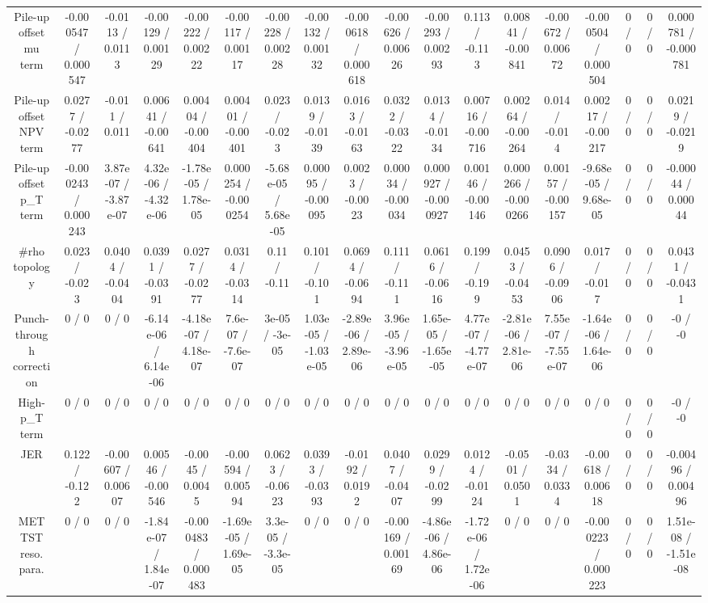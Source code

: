 \documentclass[10pt]{article}
\begin{document}
\begin{table}[htbp]
\begin{center}
\begin{tabular}{|c|c|c|c|c|c|c|c|c|c|c|c|c|c|c|c|c|c|}
  Pile-up offset mu term & -0.000547 / 0.000547 & -0.0113 / 0.0113 & -0.00129 / 0.00129 & -0.00222 / 0.00222 & -0.00117 / 0.00117 & -0.00228 / 0.00228 & -0.00132 / 0.00132 & -0.000618 / 0.000618 & -0.00626 / 0.00626 & -0.00293 / 0.00293 & 0.113 / -0.113 & 0.00841 / -0.00841 & -0.00672 / 0.00672 & -0.000504 / 0.000504 & 0 / 0 & 0 / 0 & 0.000781 / -0.000781 \\ 
  Pile-up offset NPV term & 0.0277 / -0.0277 & -0.011 / 0.011 & 0.00641 / -0.00641 & 0.00404 / -0.00404 & 0.00401 / -0.00401 & 0.023 / -0.023 & 0.0139 / -0.0139 & 0.0163 / -0.0163 & 0.0322 / -0.0322 & 0.0134 / -0.0134 & 0.00716 / -0.00716 & 0.00264 / -0.00264 & 0.014 / -0.014 & 0.00217 / -0.00217 & 0 / 0 & 0 / 0 & 0.0219 / -0.0219 \\ 
  Pile-up offset p_{T} term & -0.000243 / 0.000243 & 3.87e-07 / -3.87e-07 & 4.32e-06 / -4.32e-06 & -1.78e-05 / 1.78e-05 & 0.000254 / -0.000254 & -5.68e-05 / 5.68e-05 & 0.00095 / -0.00095 & 0.0023 / -0.0023 & 0.00034 / -0.00034 & 0.000927 / -0.000927 & 0.00146 / -0.00146 & 0.000266 / -0.000266 & 0.00157 / -0.00157 & -9.68e-05 / 9.68e-05 & 0 / 0 & 0 / 0 & -0.00044 / 0.00044 \\ 
  #rho topology & 0.023 / -0.023 & 0.0404 / -0.0404 & 0.0391 / -0.0391 & 0.0277 / -0.0277 & 0.0314 / -0.0314 & 0.11 / -0.11 & 0.101 / -0.101 & 0.0694 / -0.0694 & 0.111 / -0.111 & 0.0616 / -0.0616 & 0.199 / -0.199 & 0.0453 / -0.0453 & 0.0906 / -0.0906 & 0.017 / -0.017 & 0 / 0 & 0 / 0 & 0.0431 / -0.0431 \\ 
  Punch-through correction & 0 / 0 & 0 / 0 & -6.14e-06 / 6.14e-06 & -4.18e-07 / 4.18e-07 & 7.6e-07 / -7.6e-07 & 3e-05 / -3e-05 & 1.03e-05 / -1.03e-05 & -2.89e-06 / 2.89e-06 & 3.96e-05 / -3.96e-05 & 1.65e-05 / -1.65e-05 & 4.77e-07 / -4.77e-07 & -2.81e-06 / 2.81e-06 & 7.55e-07 / -7.55e-07 & -1.64e-06 / 1.64e-06 & 0 / 0 & 0 / 0 & -0 / -0 \\ 
  High-p_{T} term & 0 / 0 & 0 / 0 & 0 / 0 & 0 / 0 & 0 / 0 & 0 / 0 & 0 / 0 & 0 / 0 & 0 / 0 & 0 / 0 & 0 / 0 & 0 / 0 & 0 / 0 & 0 / 0 & 0 / 0 & 0 / 0 & -0 / -0 \\ 
  JER & 0.122 / -0.122 & -0.00607 / 0.00607 & 0.00546 / -0.00546 & -0.0045 / 0.0045 & -0.00594 / 0.00594 & 0.0623 / -0.0623 & 0.0393 / -0.0393 & -0.0192 / 0.0192 & 0.0407 / -0.0407 & 0.0299 / -0.0299 & 0.0124 / -0.0124 & -0.0501 / 0.0501 & -0.0334 / 0.0334 & -0.00618 / 0.00618 & 0 / 0 & 0 / 0 & -0.00496 / 0.00496 \\ 
  MET TST reso. para. & 0 / 0 & 0 / 0 & -1.84e-07 / 1.84e-07 & -0.000483 / 0.000483 & -1.69e-05 / 1.69e-05 & 3.3e-05 / -3.3e-05 & 0 / 0 & 0 / 0 & -0.00169 / 0.00169 & -4.86e-06 / 4.86e-06 & -1.72e-06 / 1.72e-06 & 0 / 0 & 0 / 0 & -0.000223 / 0.000223 & 0 / 0 & 0 / 0 & 1.51e-08 / -1.51e-08 \\ 

\end{tabular}
\end{center}
\end{table}
\end{document}
